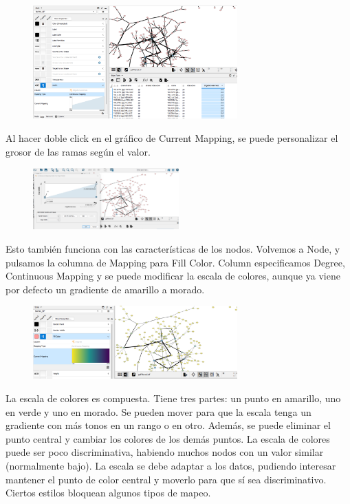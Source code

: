 \documentclass[nochap]{config/ejercicios}
\begin{document}
\begin{figure}[h]
\centering
\includegraphics[width = 0.7\textwidth]{figs/style-edgewidth.png}
\end{figure}

Al hacer doble click en el gráfico de Current Mapping, se puede personalizar el grosor de las ramas según el valor.

\begin{figure}[h]
\centering
\includegraphics[width = 0.5\textwidth]{figs/style-edgewidth2.png}
\end{figure}

Esto también funciona con las características de los nodos. Volvemos a Node, y pulsamos la columna de Mapping para Fill Color. Column especificamos Degree, Continuous Mapping y se puede modificar la escala de colores, aunque ya viene por defecto un gradiente de amarillo a morado.

\begin{figure}[h]
\centering
\includegraphics[width = 0.7\textwidth]{figs/style-nodefill.png}
\end{figure}

La escala de colores es compuesta. Tiene tres partes: un punto en amarillo, uno en verde y uno en morado. Se pueden mover para que la escala tenga un gradiente con más tonos en un rango o en otro. Además, se puede eliminar el punto central y cambiar los colores de los demás puntos. La escala de colores puede ser poco discriminativa, habiendo muchos nodos con un valor similar (normalmente bajo). La escala se debe adaptar a los datos, pudiendo interesar mantener el punto de color central y moverlo para que sí sea discriminativo.
Ciertos estilos bloquean algunos tipos de mapeo.
\end{document}
